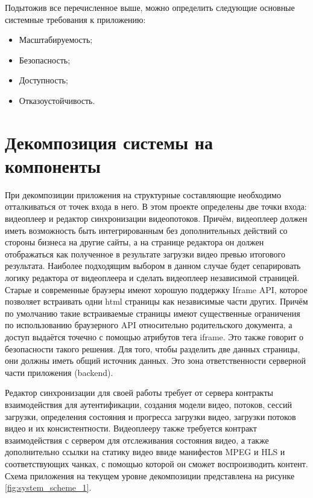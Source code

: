 	Подытожив все перечисленное выше, можно определить следующие основные системные требования к приложению:
	\begin{itemize}[label=$\bullet$]
		\item Масштабируемость;
		\item Безопасность;
		\item Доступность;
		\item Отказоустойчивость.
	\end{itemize}

\section{Декомпозиция системы на компоненты} \label{ch2:decomposition}

	При декомпозиции приложения на структурные составляющие необходимо отталкиваться от точек входа в него. В этом проекте определены две точки входа: видеоплеер и редактор синхронизации видеопотоков. Причём, видеоплеер должен иметь возможность быть интегрированным без дополнительных действий со стороны бизнеса на другие сайты, а на странице редактора он должен отображаться как полученное в результате загрузки видео превью итогового результата. Наиболее подходящим выбором в данном случае будет сепарировать логику редактора от видеоплеера и сделать видеоплеер независимой страницей. Старые и современные браузеры имеют хорошую поддержку Iframe API, которое позволяет встраивать одни html страницы как независимые части других. Причём по умолчанию такие встраиваемые страницы имеют существенные ограничения по использованию браузерного API относительно родительского документа, а доступ выдаётся точечно с помощью атрибутов тега iframe. Это также говорит о безопасности такого решения. Для того, чтобы разделить две данных страницы, они должны иметь общий источник данных. Это зона ответственности серверной части приложения (backend).

	Редактор синхронизации для своей работы требует от сервера контракты взаимодействия для аутентификации, создания модели видео, потоков, сессий загрузки, определения состояния и прогресса загрузки видео, загрузки потоков видео и их консистентности. Видеоплееру также требуется контракт взаимодействия с сервером для отслеживания состояния видео, а также дополнительно ссылки на статику видео ввиде манифестов MPEG и HLS и соответствующих чанках, с помощью которой он сможет воспроизводить контент. Схема приложения на текущем уровне декомпозиции представлена на рисунке \ref{fig:system_scheme_1}.


